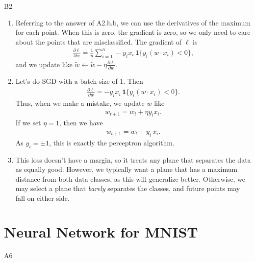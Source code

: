 \documentclass{article}
\begin{document}
B2

\begin{enumerate}
        \item Referring to the answer of A2.b.b, we can use the derivatives of the maximum for each point.
        When this is zero, the gradient is zero, so we only need to care about the points that are misclassified.
        The gradient of $\ell$ is
        \begin{align*}
                \frac{\partial \ell}{\partial w} = 
                \frac{1}{n} \sum_{i=1}^n -y_i x_i \, \mathbf{1}\{y_i(w \cdot x_i) < 0\},
        \end{align*}
        and we update like $\tilde{w} \leftarrow \tilde{w} - \eta \frac{\partial \ell}{\partial w}$.

        \item Let's do SGD with a batch size of 1.
        Then
        \begin{align*}
                \frac{\partial \ell}{\partial w} = 
                -y_i x_i \, \mathbf{1}\{y_i(w \cdot x_i) < 0\}.
        \end{align*}
        Thus, when we make a mistake, we update $w$ like
        \begin{align*}
                w_{t+1} = w_t + \eta y_i x_i.
        \end{align*}
        If we set $\eta = 1$, then we have
        \begin{align*}
                w_{t+1} = w_t + y_i \, x_i.
        \end{align*}
        As $y_i = \pm 1$, this is exactly the perceptron algorithm.

        \item This loss doesn't have a margin, so it treats any plane that separates the data as equally good.
        However, we typically want a plane that has a maximum distance from both data classes, as this will generalize better.
        Otherwise, we may select a plane that \textit{barely} separates the classes, and future points may fall on either side.
\end{enumerate}

\newpage
\section*{Neural Network for MNIST}

A6
\end{document}
